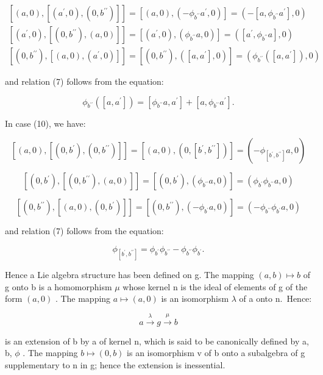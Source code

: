 \[
\begin{array}{l} [ (a, 0), [ (a ^ {\prime}, 0), (0, b ^ {\prime \prime}) ] ] = [ (a, 0), (- \phi_ {b ^ {\prime \prime}} a ^ {\prime}, 0) ] = (- [ a, \phi_ {b ^ {\prime \prime}} a ^ {\prime} ], 0) \\ {} [ (a ^ {\prime}, 0), [ (0, b ^ {\prime \prime}), (a, 0) ] ] = [ (a ^ {\prime}, 0), (\phi_ {b ^ {\prime \prime}} a, 0) ] = ([ a ^ {\prime}, \phi_ {b ^ {\prime \prime}} a ], 0) \\ {} [ (0, b ^ {\prime \prime}), [ (a, 0), (a ^ {\prime}, 0) ] ] = [ (0, b ^ {\prime \prime}), ([ a, a ^ {\prime} ], 0) ] = (\phi_ {b ^ {\prime \prime}} ([ a, a ^ {\prime} ]), 0) \end{array}
\]

and relation (7) follows from the equation:

\[
\phi_ {b ^ {\prime \prime}} ([ a, a ^ {\prime} ]) = [ \phi_ {b ^ {\prime \prime}} a, a ^ {\prime} ] + [ a, \phi_ {b ^ {\prime \prime}} a ^ {\prime} ].
\]

In case (10), we have:

\[
[ (a, 0), [ (0, b ^ {\prime}), (0, b ^ {\prime \prime}) ] ] = [ (a, 0), (0, [ b ^ {\prime}, b ^ {\prime \prime} ]) ] = (- \phi_ {[ b ^ {\prime}, b ^ {\prime \prime} ]} a, 0)
\]

\[
[ (0, b ^ {\prime}), [ (0, b ^ {\prime \prime}), (a, 0) ] ] = [ (0, b ^ {\prime}), (\phi_ {b ^ {\prime \prime}} a, 0) ] = (\phi_ {b ^ {\prime}} \phi_ {b ^ {\prime \prime}} a, 0)
\]

\[
[ (0, b ^ {\prime \prime}), [ (a, 0), (0, b ^ {\prime}) ] ] = [ (0, b ^ {\prime \prime}), (- \phi_ {b ^ {\prime}} a, 0) ] = (- \phi_ {b ^ {\prime \prime}} \phi_ {b ^ {\prime}} a, 0)
\]

and relation (7) follows from the equation:

\[
\phi_ {[ b ^ {\prime}, b ^ {\prime \prime} ]} = \phi_ {b ^ {\prime}} \phi_ {b ^ {\prime \prime}} - \phi_ {b ^ {\prime \prime}} \phi_ {b ^ {\prime}}.
\]

Hence a Lie algebra structure has been defined on g. The mapping \((a, b) \mapsto b\) of g onto b is a homomorphism \(\mu\) whose kernel n is the ideal of elements of g of the form \((a, 0)\) . The mapping \(a \mapsto (a, 0)\) is an isomorphism \(\lambda\) of a onto n.~Hence:

\[
a \xrightarrow {\lambda} g \xrightarrow {\mu} b\tag{12}
\]

is an extension of b by a of kernel n, which is said to be canonically defined by a, b, \(\phi\) . The mapping \(b \mapsto (0, b)\) is an isomorphism v of b onto a subalgebra of g supplementary to n in g; hence the extension is inessential.

